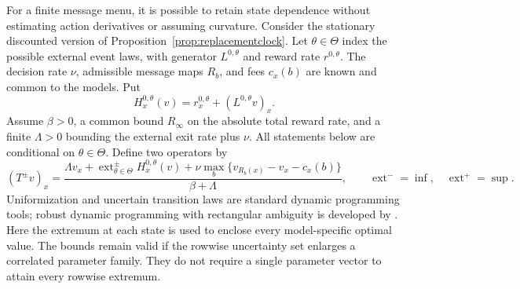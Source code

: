 \documentclass[11pt]{article}
\theoremstyle{plain}
\theoremstyle{definition}
\theoremstyle{remark}
\begin{document}
For a finite message menu, it is possible to retain state dependence
without estimating action derivatives or assuming curvature. Consider
the stationary discounted version of
Proposition~\ref{prop:replacementclock}. Let \(\theta\in\Theta\) index
the possible external event laws, with generator \(L^{0,\theta}\) and
reward rate \(r^{0,\theta}\). The decision rate \(\nu\), admissible
message maps \(R_b\), and fees \(c_x(b)\) are known and common to the
models. Put
\[
 H_x^{0,\theta}(v)=r_x^{0,\theta}+(L^{0,\theta}v)_x.
\]
Assume \(\beta>0\), a common bound \(R_\infty\) on the absolute total
reward rate, and a finite \(\Lambda>0\) bounding the external exit
rate plus \(\nu\). All statements below are conditional on
\(\theta\in\Theta\). Define two operators by
\begin{equation}\label{eq:intervalbellman}
 (T^\pm v)_x=
 \frac{\Lambda v_x+\operatorname{ext}^{\pm}_{\theta\in\Theta}
                  H_x^{0,\theta}(v)
       +\nu\max_b\{v_{R_b(x)}-v_x-c_x(b)\}}{\beta+\Lambda},
 \qquad \operatorname{ext}^-=\inf,\quad
        \operatorname{ext}^+=\sup .
\end{equation}
Uniformization and uncertain transition laws are standard dynamic
programming tools; robust dynamic programming with rectangular
ambiguity is developed by \citet{Iyengar2005}. Here the extremum at
each state is used to enclose every model-specific optimal value.
The bounds remain valid if the rowwise uncertainty set enlarges a
correlated parameter family. They do not require a single parameter
vector to attain every rowwise extremum.
\end{document}
